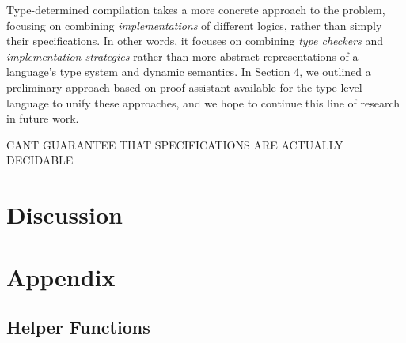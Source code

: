 \documentclass{llncs}
\begin{document}
Type-determined compilation takes a more concrete approach to the problem, focusing on combining {\it implementations} of different\- logics, rather than simply their specifications. In other words, it focuses on combining {\it type checkers} and {\it implementation strategies} rather than more abstract representations of a language's type system and dynamic semantics. In Section 4, we outlined a preliminary approach based on proof assistant available for the type-level language to unify these approaches, and we hope to continue this line of research in future work.

CANT GUARANTEE THAT SPECIFICATIONS ARE ACTUALLY DECIDABLE 
\section{Discussion}\label{discussion}


\appendix
\section{Appendix}
\subsection{Helper Functions}\label{helper}
\end{document}
